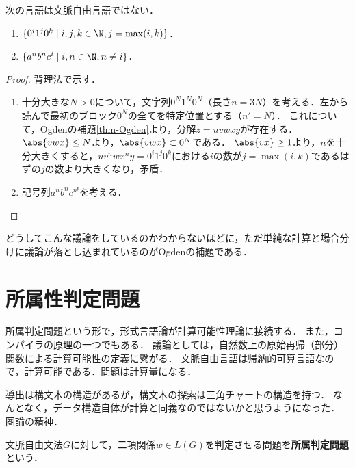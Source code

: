 \begin{corollary}
    次の言語は文脈自由言語ではない．
    \begin{enumerate}
        \item $\{0^i1^j0^k\mid i,j,k\in\N,j=\max(i,k)\}$．
        \item $\{a^nb^nc^i\mid i,n\in\N, n\ne i\}$．
    \end{enumerate}
\end{corollary}
\begin{proof}
    背理法で示す．
    \begin{enumerate}
        \item 
        十分大きな$N>0$について，文字列$0^N1^N0^N$（長さ$n=3N$）を考える．左から読んで最初のブロック$0^N$の全てを特定位置とする（$n'=N$）．
        これについて，Ogdenの補題\ref{thm-Ogden}より，分解$z=uvwxy$が存在する．
        $\abs{vwx}\le N$より，$\abs{vwx}\subset 0^N$である．
        $\abs{vx}\ge 1$より，$n$を十分大きくすると，$uv^nwx^ny=0^i1^j0^k$における$i$の数が$j=\max(i,k)$であるはずの$j$の数より大きくなり，矛盾．
        \item 記号列$a^nb^nc^{n!}$を考える．
        
    \end{enumerate}
\end{proof}
\begin{remarks}
    どうしてこんな議論をしているのかわからないほどに，ただ単純な計算と場合分けに議論が落とし込まれているのがOgdenの補題である．
\end{remarks}

\section{所属性判定問題}

\begin{tcolorbox}[colframe=ForestGreen, colback=ForestGreen!10!white, breakable]
    所属判定問題という形で，形式言語論が計算可能性理論に接続する．
    また，コンパイラの原理の一つでもある．
    議論としては，自然数上の原始再帰（部分）関数による計算可能性の定義に繋がる．
    文脈自由言語は帰納的可算言語なので，計算可能である．問題は計算量になる．

    導出は構文木の構造があるが，構文木の探索は三角チャートの構造を持つ．
    なんとなく，データ構造自体が計算と同義なのではないかと思うようになった．
    圏論の精神．
\end{tcolorbox}

\begin{definition}
    文脈自由文法$G$に対して，二項関係$w\in L(G)$を判定させる問題を\textbf{所属判定問題}という．
\end{definition}

